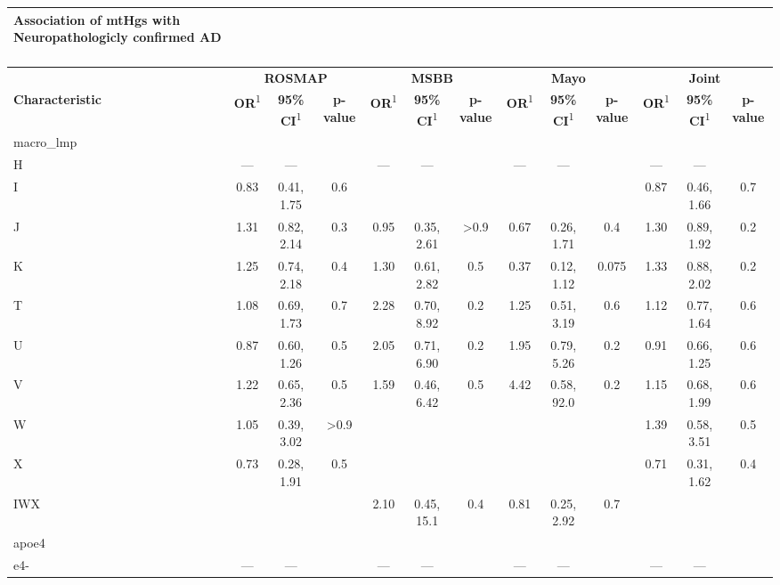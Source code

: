 \documentclass[]{book}
\begin{document}
\captionsetup[table]{labelformat=empty,skip=1pt}
\begin{longtable}{lcccccccccccc}
\caption*{
\large Association of mtHgs with Neuropathologicly confirmed AD\\ 
\small \\ 
} \\ 
\toprule
& \multicolumn{3}{c}{\textbf{ROSMAP}} & \multicolumn{3}{c}{\textbf{MSBB}} & \multicolumn{3}{c}{\textbf{Mayo}} & \multicolumn{3}{c}{\textbf{Joint}} \\ 
 \cmidrule(lr){2-4}\cmidrule(lr){5-7}\cmidrule(lr){8-10}\cmidrule(lr){11-13}
\textbf{Characteristic} & \textbf{OR}\textsuperscript{1} & \textbf{95\% CI}\textsuperscript{1} & \textbf{p-value} & \textbf{OR}\textsuperscript{1} & \textbf{95\% CI}\textsuperscript{1} & \textbf{p-value} & \textbf{OR}\textsuperscript{1} & \textbf{95\% CI}\textsuperscript{1} & \textbf{p-value} & \textbf{OR}\textsuperscript{1} & \textbf{95\% CI}\textsuperscript{1} & \textbf{p-value} \\ 
\midrule
macro\_lmp &  &  &  &  &  &  &  &  &  &  &  &  \\ 
H & --- & --- &  & --- & --- &  & --- & --- &  & --- & --- &  \\ 
I & 0.83 & 0.41, 1.75 & 0.6 &  &  &  &  &  &  & 0.87 & 0.46, 1.66 & 0.7 \\ 
J & 1.31 & 0.82, 2.14 & 0.3 & 0.95 & 0.35, 2.61 & >0.9 & 0.67 & 0.26, 1.71 & 0.4 & 1.30 & 0.89, 1.92 & 0.2 \\ 
K & 1.25 & 0.74, 2.18 & 0.4 & 1.30 & 0.61, 2.82 & 0.5 & 0.37 & 0.12, 1.12 & 0.075 & 1.33 & 0.88, 2.02 & 0.2 \\ 
T & 1.08 & 0.69, 1.73 & 0.7 & 2.28 & 0.70, 8.92 & 0.2 & 1.25 & 0.51, 3.19 & 0.6 & 1.12 & 0.77, 1.64 & 0.6 \\ 
U & 0.87 & 0.60, 1.26 & 0.5 & 2.05 & 0.71, 6.90 & 0.2 & 1.95 & 0.79, 5.26 & 0.2 & 0.91 & 0.66, 1.25 & 0.6 \\ 
V & 1.22 & 0.65, 2.36 & 0.5 & 1.59 & 0.46, 6.42 & 0.5 & 4.42 & 0.58, 92.0 & 0.2 & 1.15 & 0.68, 1.99 & 0.6 \\ 
W & 1.05 & 0.39, 3.02 & >0.9 &  &  &  &  &  &  & 1.39 & 0.58, 3.51 & 0.5 \\ 
X & 0.73 & 0.28, 1.91 & 0.5 &  &  &  &  &  &  & 0.71 & 0.31, 1.62 & 0.4 \\ 
IWX &  &  &  & 2.10 & 0.45, 15.1 & 0.4 & 0.81 & 0.25, 2.92 & 0.7 &  &  &  \\ 
apoe4 &  &  &  &  &  &  &  &  &  &  &  &  \\ 
e4- & --- & --- &  & --- & --- &  & --- & --- &  & --- & --- &  \\ 

\end{longtable}
\end{document}
